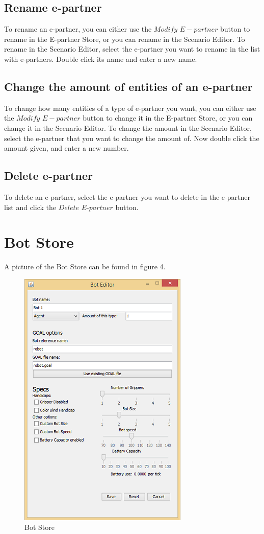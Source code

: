 \documentclass[a4paper]{article}
\begin{document}
\subsection{Rename e-partner}
To rename an e-partner, you can either use the $Modify$ $E-partner$ button to rename in the E-partner Store, or you can rename in the Scenario Editor. To rename in the Scenario Editor, select the e-partner you want to rename in the list with e-partners. Double click its name and enter a new name.

\subsection{Change the amount of entities of an e-partner}
To change how many entities of a type of e-partner you want, you can either use the $Modify$ $E-partner$ button to change it in the E-partner Store, or you can change it in the Scenario Editor. To change the amount in the Scenario Editor, select the e-partner that you want to change the amount of. Now double click the amount given, and enter a new number.

\subsection{Delete e-partner}
To delete an e-partner, select the e-partner you want to delete in the e-partner list and click the $Delete$ $E$-$partner$ button.

\section{Bot Store}
A picture of the Bot Store can be found in figure 4.
\begin{figure}[h]
\begin{center}
\includegraphics{bs.png}
\end{center}
\caption{Bot Store}
\end{figure}
\end{document}

